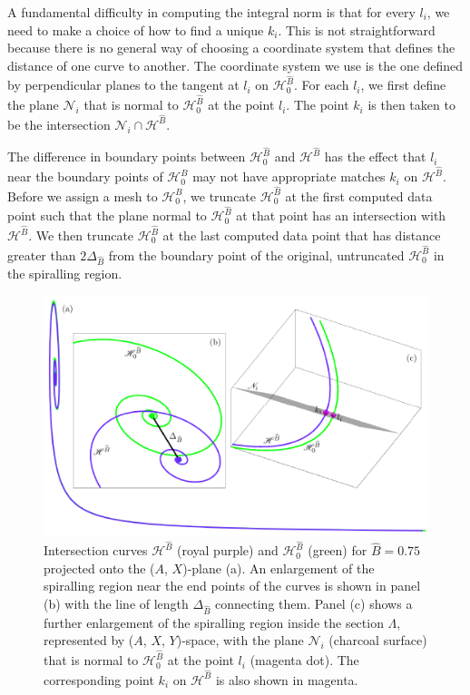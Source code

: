 \documentclass{ws-ijbc}
\begin{document}
A fundamental difficulty in computing the integral norm is that for every $l_i$, we need to make a choice of how to find a unique $k_i$.  This is not straightforward because there is no general way of choosing a coordinate system that defines the distance of one curve to another.  The coordinate system we use is the one defined by perpendicular planes to the tangent at $l_i$ on $\mathscr{H}^{\widehat{B}}_0$.  For each $l_i$, we first define the plane $\mathscr{N}_i$ that is normal to $\mathscr{H}_0^{\widehat{B}}$ at the point $l_i$.  The point $k_i$ is then taken to be the intersection $\mathscr{N}_i \cap \mathscr{H}^{\widehat{B}}$.

The difference in boundary points between $\mathscr{H}_0^{\widehat{B}}$ and $\mathscr{H}^{\widehat{B}}$ has the effect that $l_i$ near the boundary points of $\mathscr{H}_0^{\widehat{B}}$ may not have appropriate matches $k_i$ on $\mathscr{H}^{\widehat{B}}$.  Before we assign a mesh to $\mathscr{H}_0^{\widehat{B}}$, we truncate $\mathscr{H}_0^{\widehat{B}}$ at the first computed data point such that the plane normal to $\mathscr{H}_0^{\widehat{B}}$ at that point has an intersection with $\mathscr{H}^{\widehat{B}}$.  We then truncate $\mathscr{H}_0^{\widehat{B}}$ at the last computed data point that has distance greater than $2\Delta_{\widehat{B}}$ from the boundary point of the original, untruncated $\mathscr{H}^{\widehat{B}}_0$ in the spiralling region.


\begin{figure}[H]
\centering
\includegraphics[]{./figures/MKMO_21.pdf}
\caption{Intersection curves $\mathscr{H}^{\widehat{B}}$ (royal purple) and $\mathscr{H}_0^{\widehat{B}}$ (green) for $\widehat{B}=0.75$ projected onto the ($A$, $X$)-plane (a).  An enlargement of the spiralling region near the end points of the curves is shown in panel (b) with the line of length $\Delta_{\widehat{B}}$ connecting them.  Panel (c) shows a further enlargement of the spiralling region inside the section $\Lambda$, represented by  ($A$, $X$, $Y$)-space, with the plane $\mathscr{N}_i$ (charcoal surface) that is normal to $\mathscr{H}_0^{\widehat{B}}$ at the point $l_i$ (magenta dot).  The corresponding point $k_i$ on $\mathscr{H}^{\widehat{B}}$ is also shown in magenta.}
\label{figure_21}
\end{figure}
\end{document}
